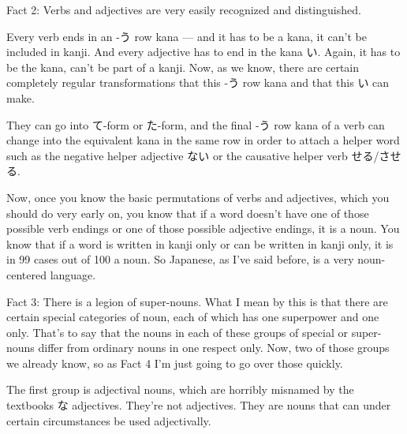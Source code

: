 \stopsectionlevel

\startsectionlevel[title={Fact 2},reference={fact-2}]

Fact 2: Verbs and adjectives are very easily recognized and distinguished.

{}

Every verb ends in an -う row kana --- and it has to be a kana, it can't be included in kanji. And every adjective has to end in the kana い. Again, it has to be the kana, can't be part of a kanji. Now, as we know, there are certain completely regular transformations that this -う row kana and that this い can make.

They can go into て-form or た-form, and the final -う row kana of a verb can change into the equivalent kana in the same row in order to attach a helper word such as the negative helper adjective ない or the causative helper verb せる/させる.

{}

Now, once you know the basic permutations of verbs and adjectives, which you should do very early on, you know that if a word doesn't have one of those possible verb endings or one of those possible adjective endings, it is a noun. You know that if a word is written in kanji only or can be written in kanji only, it is in 99 cases out of 100 a noun. So Japanese, as I've said before, is a very noun-centered language.

\stopsectionlevel

\startsectionlevel[title={Fact 3},reference={fact-3}]

Fact 3: There is a legion of super-nouns. What I mean by this is that there are certain special categories of noun, each of which has one superpower and one only. That's to say that the nouns in each of these groups of special or super-nouns differ from ordinary nouns in one respect only. Now, two of those groups we already know, so as Fact 4 I'm just going to go over those quickly.

\stopsectionlevel

\startsectionlevel[title={Fact 4},reference={fact-4}]

\startsectionlevel[title={Adjectival nouns},reference={adjectival-nouns}]

The first group is adjectival nouns, which are horribly misnamed by the textbooks な adjectives. They're not adjectives. They are nouns that can under certain circumstances be used adjectivally.

